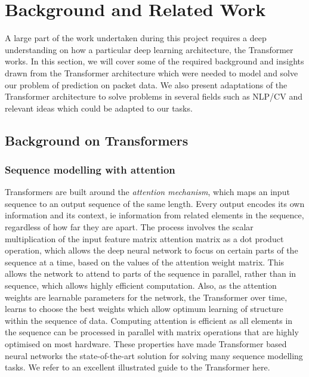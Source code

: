 \chapter{Background and Related Work}
\label{cha:background}

A large part of the work undertaken during this project requires a deep understanding on how a particular deep learning architecture, the Transformer works. In this section, we will cover some of the required background and insights drawn from the Transformer architecture which were needed to model and solve our problem of prediction on packet data. We also present adaptations of the Transformer architecture to solve problems in several fields such as NLP/CV and relevant ideas which could be adapted to our tasks.

\section{Background on Transformers}
\label{sec:background}

\subsection{Sequence modelling with attention}
\label{ssec:bgsequence}

Transformers are built around the \emph{attention mechanism}, which maps an input sequence to an output sequence of the same length.
Every output encodes its own information and its context, ie information from related elements in the sequence, regardless of how far they are apart.
The process involves the scalar multiplication of the input feature matrix attention matrix as a dot product operation, which allows the deep neural network to focus on certain parts of the sequence at a time, based on the values of the attention weight matrix. This allows the network to attend to parts of the sequence in parallel, rather than in sequence, which allows highly efficient computation. Also, as the attention weights are learnable parameters for the network, the Transformer over time, learns to choose the best weights which allow optimum learning of structure within the sequence of data.
Computing attention is efficient as all elements in the sequence can be processed in parallel with matrix operations that are highly optimised on most hardware. These properties have made Transformer based neural networks the state-of-the-art solution for solving many sequence modelling tasks. We refer to an excellent illustrated guide to the Transformer here\cite{trans}.



